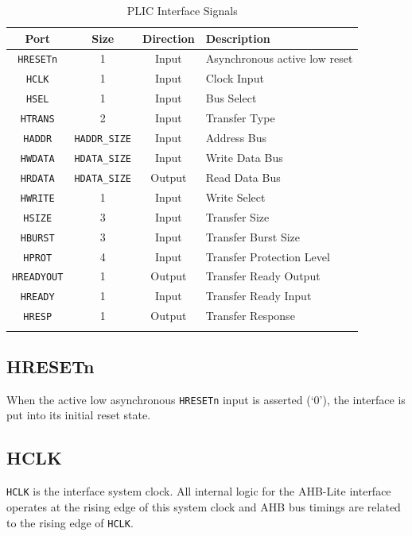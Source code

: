 \begin{longtable}[c]{@{\extracolsep{\fill}}cccl@{}}	
	\toprule 
	\textbf{Port} & \textbf{Size} & \textbf{Direction} & \textbf{Description}\\
	\midrule
	\endhead 
	\texttt{HRESETn}   & 1 & Input  & Asynchronous active low reset\\
	\texttt{HCLK}      & 1 & Input  & Clock Input\\
	\texttt{HSEL}      & 1 & Input  & Bus Select\\
	\texttt{HTRANS}    & 2 & Input  & Transfer Type\\
	\texttt{HADDR}     & \texttt{HADDR\_SIZE} & Input & Address Bus\\
	\texttt{HWDATA}    & \texttt{HDATA\_SIZE} & Input & Write Data Bus\\
	\texttt{HRDATA}    & \texttt{HDATA\_SIZE} & Output & Read Data Bus\\
	\texttt{HWRITE}    & 1 & Input  & Write Select\\
	\texttt{HSIZE}     & 3 & Input  & Transfer Size\\
	\texttt{HBURST}    & 3 & Input  & Transfer Burst Size\\
	\texttt{HPROT}     & 4 & Input  & Transfer Protection Level\\
	\texttt{HREADYOUT} & 1 & Output & Transfer Ready Output\\
	\texttt{HREADY}    & 1 & Input  & Transfer Ready Input\\
	\texttt{HRESP}     & 1 & Output & Transfer Response\\
	\bottomrule 	
	\caption{PLIC Interface Signals}
	\label{tab:AHBIF}
\end{longtable}

\subsection{HRESETn}

When the active low asynchronous \texttt{HRESETn} input is asserted
(`0'), the interface is put into its initial reset state.

\subsection{HCLK}

\texttt{HCLK} is the interface system clock. All internal logic for the
AHB-Lite interface operates at the rising edge of this system clock and
AHB bus timings are related to the rising edge of \texttt{HCLK}.

